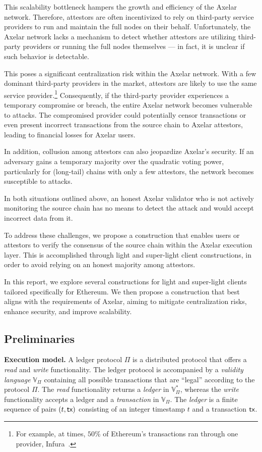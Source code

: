This scalability bottleneck hampers the growth and efficiency of the Axelar network. Therefore, attestors are often incentivized to rely on third-party service providers to run and maintain the full nodes on their behalf. Unfortunately, the Axelar network lacks a mechanism to detect whether attestors are utilizing third-party providers or running the full nodes themselves --- in fact, it is unclear if such behavior is detectable.

This poses a significant centralization risk within the Axelar network. With a few dominant third-party providers in the market, attestors are likely to use the same service provider.\footnote{For example, at times, $50$\% of Ethereum's transactions ran through one provider, Infura~\cite{infura}.} Consequently, if the third-party provider experiences a temporary compromise or breach, the entire Axelar network becomes vulnerable to attacks. The compromised provider could potentially censor transactions or even present incorrect transactions from the source chain to Axelar attestors, leading to financial losses for Axelar users.

In addition, collusion among attestors can also jeopardize Axelar's security. If an adversary gains a temporary majority over the quadratic voting power, particularly for (long-tail) chains with only a few attestors, the network becomes susceptible to attacks.

In both situations outlined above, an honest Axelar validator who is not actively monitoring the source chain has no means to detect the attack and would accept incorrect data from it.

To address these challenges, we propose a construction that enables users or attestors to verify the consensus of the source chain within the Axelar execution layer. This is accomplished through light and super-light client constructions, in order to avoid relying on an honest majority among attestors.

In this report, we explore several constructions for light and super-light clients tailored specifically for Ethereum. We then propose a construction that best aligns with the requirements of Axelar, aiming to mitigate centralization risks, enhance security, and improve scalability.

\subsection{Preliminaries}
\noindent
\textbf{Execution model.}
A ledger protocol $\Pi$ is a distributed protocol that offers
a \emph{read} and \emph{write} functionality.
The ledger protocol is accompanied by a \emph{validity language}
$\mathbb{V}_{\Pi}$ containing all possible transactions that are ``legal''
according to the protocol $\Pi$.
The
\emph{read} functionality returns a \emph{ledger} in $\mathbb{V}_{\Pi}^*$,
whereas the \emph{write} functionality accepts a ledger and a \emph{transaction} in $\mathbb{V}_\Pi$.
The \emph{ledger} is a finite sequence of pairs $(t, \textsf{tx})$ consisting
of an integer timestamp $t$ and a transaction $\textsf{tx}$.

